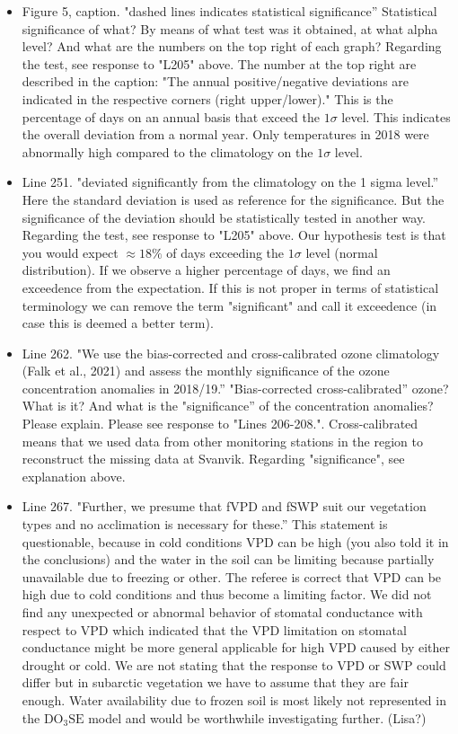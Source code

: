 \documentclass{scrartcl}
\begin{document}
\begin{itemize}
\item {\color{blue}Figure 5, caption. "dashed lines indicates statistical significance” Statistical significance of what? By means of what test was it obtained, at what alpha level? And what are the numbers on the top right of each graph?}
Regarding the test, see response to "L205" above. The number at the top right are described in the caption: "The annual positive/negative deviations are indicated in the respective corners (right upper/lower)." This is the percentage of days on an annual basis that exceed the $1\sigma$ level. This indicates the overall deviation from a normal year. Only temperatures in 2018 were abnormally high compared to the climatology on the $1\sigma$ level.

\item {\color{blue}Line 251. "deviated significantly from the climatology on the 1 sigma level.” Here the standard deviation is used as reference for the significance. But the significance of the deviation should be statistically tested in another way.}
Regarding the test, see response to "L205" above. Our hypothesis test is that you would expect $\approx18\%$ of days exceeding the $1\sigma$ level (normal distribution). If we observe a higher percentage of days, we find an exceedence from the expectation. If this is not proper in terms of statistical terminology we can remove the term "significant" and call it exceedence (in case this is deemed a better term).

\item {\color{blue}Line 262. "We use the bias-corrected and cross-calibrated ozone climatology (Falk et al., 2021) and assess the monthly significance of the ozone concentration anomalies in 2018/19.” 
"Bias-corrected cross-calibrated” ozone? What is it? And what is the "significance” of the concentration anomalies? Please explain.}
Please see response to "Lines 206-208.". Cross-calibrated means that we used data from other monitoring stations in the region to reconstruct the missing data at Svanvik. Regarding "significance", see explanation above.

\item {\color{blue}Line 267. "Further, we presume that fVPD and fSWP suit our vegetation types and no acclimation is necessary for these.” This statement is questionable, because in cold conditions VPD can be high (you also told
it in the conclusions) and the water in the soil can be limiting because partially unavailable due to freezing or other.}
The referee is correct that VPD can be high due to cold conditions and thus become a limiting factor. We did not find any unexpected or abnormal behavior of stomatal conductance with respect to VPD which indicated that the VPD limitation on stomatal conductance might be more general applicable for high VPD caused by either drought or cold. We are not stating that the response to VPD or SWP could differ but in subarctic vegetation we have to assume that they are fair enough. Water availability due to frozen soil is most likely not represented in the $\mathrm{DO_3SE}$ model and would be worthwhile investigating further. (Lisa?)


\end{itemize}
\end{document}
